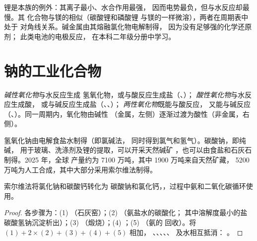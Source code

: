 锂是本族的例外：其离子最小、水合作用最强，
因而电势最负，但与水反应却最慢。其
化合物与镁的相似（碳酸锂和磷酸锂
与镁的一样微溶），两者在周期表中处于
对角线关系。碱金属由其熔融氯化物电解制得，
因为没有足够强的化学还原剂；
此类电池的电极反应，
在本科二年级分册中学习。

\section{钠的工业化合物}

\begin{definition}[氧化物的性质]\label{def:b1:s-block:oxide-character}
\emph{碱性氧化物}与水反应生成
氢氧化物，或与酸反应生成盐（、）；
\emph{酸性氧化物}与水反应生成酸，
或与碱反应生成盐（、、）；
\emph{两性氧化物}既能与酸反应，
又能与碱反应（、）。同一周期内，氧化物由碱性
（金属，左侧）逐渐过渡为酸性（非金属，右侧）。
\end{definition}

氢氧化钠由电解食盐水制得（即氯碱法，
同时得到氯气和氢气）。碳酸钠，即纯碱，
用于玻璃、洗涤剂及锂的提取，可以开采天然碱矿
，也可以由食盐和石灰石制得。2025 年，全球
产量约为 7100 万吨，其中 1900 万吨来自天然矿藏，
5200 万吨为人工合成，其中大部分采用索尔维法制得。

\begin{proposition}[索尔维法]\label{prop:b1:s-block:solvay}
索尔维法将氯化钠和碳酸钙转化为
碳酸钠和氯化钙，，过程中氨和二氧化碳循环使用。
\end{proposition}

\begin{proof}
各步骤为：(1) （石灰窑）；(2) （氨盐水的碳酸化；
其中溶解度最小的盐碳酸氢钠沉淀析出）；(3)
（煅烧）；(4) ；(5) （氨的
回收）。将 $(1) + 2\times(2) + (3) + (4) + (5)$ 相加，
、、、、、 及水相互抵消：
。
\end{proof}

